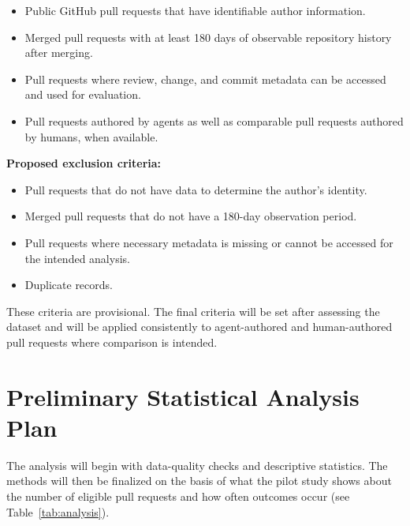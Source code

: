 \documentclass[stu,12pt,donotrepeattitle]{apa7}
\begin{document}
\begin{itemize}
  \item Public GitHub pull requests that have identifiable author information.
  \item Merged pull requests with at least 180 days of observable repository history after merging.
  \item Pull requests where review, change, and commit metadata can be accessed and used for evaluation.
  \item Pull requests authored by agents as well as comparable pull requests authored by humans, when available.
\end{itemize}

\textbf{Proposed exclusion criteria:}

\begin{itemize}
  \item Pull requests that do not have data to determine the author's identity.
  \item Merged pull requests that do not have a 180-day observation period.
  \item Pull requests where necessary metadata is missing or cannot be accessed for the intended analysis.
  \item Duplicate records.
\end{itemize}

These criteria are provisional. The final criteria will be set after assessing the dataset and will be applied consistently to agent-authored and human-authored pull requests where comparison is intended.

\section{Preliminary Statistical Analysis Plan}

The analysis will begin with data-quality checks and descriptive statistics. The methods will then be finalized on the basis of what the pilot study shows about the number of eligible pull requests and how often outcomes occur (see Table~\ref{tab:analysis}).
\end{document}
